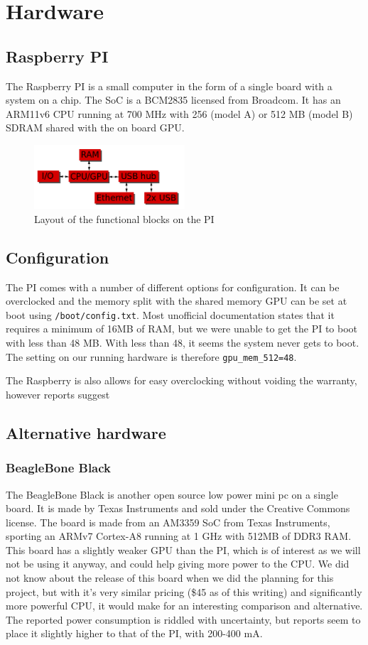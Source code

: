 \section{Hardware}
\subsection{Raspberry PI}
The Raspberry PI is a small computer in the form of a single board with a system on a chip. The SoC is a BCM2835 licensed from Broadcom. It has an ARM11v6 CPU running at 700 MHz with 256 (model A) or 512 MB (model B) SDRAM shared with the on board GPU.
\begin{figure}
    \includegraphics[width=0.5\textwidth]{hardware/raspberrypi_block_function}
    \caption{Layout of the functional blocks on the PI}
    \label{fig:pi_blockdiagram}
\end{figure}
\subsection{Configuration}
The PI comes with a number of different options for configuration. It can be overclocked and the memory split with the shared memory GPU can be set at boot using {\tt /boot/config.txt}.
Most unofficial documentation states that it requires a minimum of 16MB of RAM, but we were unable to get the PI to boot with less than 48 MB. With less than 48, it seems the system never gets to boot.
The setting on our running hardware is therefore {\tt gpu\_mem\_512=48}.

The Raspberry is also allows for easy overclocking without voiding the warranty, however reports suggest
\subsection{Alternative hardware}
\subsubsection{BeagleBone Black}
The BeagleBone Black is another open source low power mini pc on a single board. It is made by Texas Instruments and sold under the Creative Commons license.
The board is made from an AM3359 SoC from Texas Instruments, sporting an ARMv7 Cortex-A8 running at 1 GHz with 512MB of DDR3 RAM. This board has a slightly weaker GPU than the PI, which is of interest as we will not be using it anyway, and could help giving more power to the CPU.
We did not know about the release of this board when we did the planning for this project, but with it's very similar pricing (\$45 as of this writing) and significantly more powerful CPU, it would make for an interesting comparison and alternative. The reported power consumption is riddled with uncertainty, but reports seem to place it slightly higher to that of the PI, with 200-400 mA.
